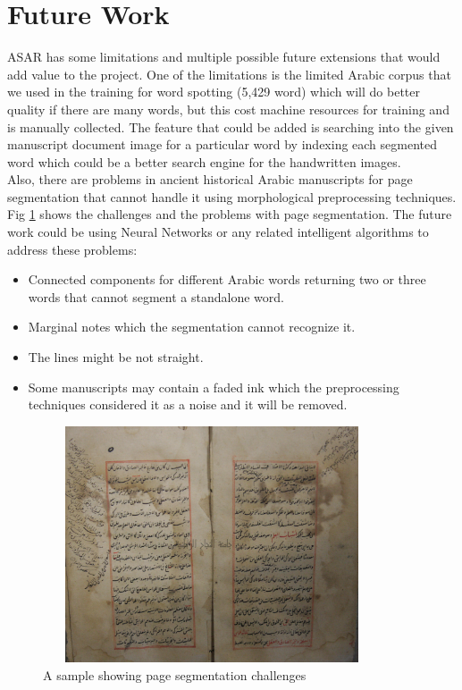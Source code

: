 \section{Future Work}
ASAR has some limitations and multiple possible future extensions that would add value to the project. One of the limitations is the limited Arabic corpus that we used in the training for word spotting (5,429 word) which will do better quality if there are many words, but this cost machine resources for training and is manually collected. The feature that could be added is searching into the given manuscript document image for a particular word by indexing each segmented word which could be a better search engine for the handwritten images. \\

Also, there are problems in ancient historical Arabic manuscripts for page segmentation that cannot handle it using morphological preprocessing techniques. Fig \ref{fig:page-chanllenges} shows the challenges and the problems with page segmentation. The future work could be using Neural Networks or any related intelligent algorithms to address these problems:

\begin{itemize}[itemsep=1pt, topsep=5pt]
    \item Connected components for different Arabic words returning two or three words that cannot segment a standalone word.
    \item Marginal notes which the segmentation cannot recognize it.
    \item The lines might be not straight. 
    \item Some manuscripts may contain a faded ink which the preprocessing techniques considered it as a noise and it will be removed.
\end{itemize}

\begin{figure}[!htb]
    \centering
    \includegraphics[width=10cm,height=7cm]{images/page-seg-challenges.png}
    \caption{A sample showing page segmentation challenges}
    \label{fig:page-chanllenges}
\end{figure}

\newpage

\printbibliography
